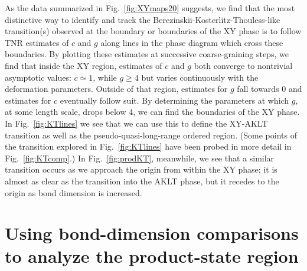 \documentclass[aps,prb,letterpaper,superscriptaddress,twocolumn,showpacs,floatfix,10pt]{revtex4-1}
\begin{document}
As the data summarized in Fig.~\ref{fig:XYmaps20} suggests, 
we find that the most distinctive way to identify and track the
Berezinskii-Kosterlitz-Thouless-like transition(s) observed at the boundary
or boundaries of the XY phase is to follow TNR estimates of $c$ and $g$ along
lines in the phase diagram which cross these boundaries. By plotting these
estimates at successive coarse-graining steps, we find that inside the XY
region, estimates of $c$ and $g$ both converge to nontrivial asymptotic
values: $c \simeq 1$, while $g \geq 4$ but varies continuously with the
deformation parameters.
Outside of that region, estimates for $g$ fall towards 0 and
estimates for $c$ eventually follow suit. By determining the parameters at
which $g$, at some length scale, drops below 4, we can find the boundaries of
the XY phase. In Fig.~\ref{fig:KTlines} we see that we can use this to define
the XY-AKLT transition as well as the pseudo-quasi-long-range ordered region.
(Some points of the transition explored in Fig.~\ref{fig:KTlines} have been
probed in more detail in Fig.~\ref{fig:KTcomp}.) In Fig.~\ref{fig:prodKT},
meanwhile, we see that a similar transition occurs as we approach the
origin from within the XY phase; it is almost as clear as the
transition into the AKLT phase, but it recedes to the origin as
bond dimension is increased.


\section{Using bond-dimension comparisons to analyze the product-state region}
\label{app:linecomp}
\end{document}
